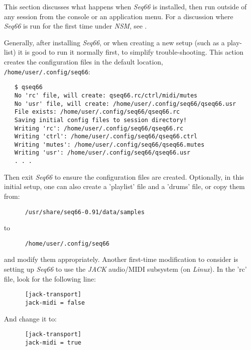    This section discusses what happens when \textsl{Seq66} is installed, then
   run outside of any session from the console or an application menu.
   For a discussion where \textsl{Seq66} is run for the first time under
   \textsl{NSM},
   see .

   Generally, after installing \textsl{Seq66}, or when creating a new setup
   (such as a play-list) it is good to run it normally first, to simplify
   trouble-shooting.
   This action creates the configuration files in the default location,
   \texttt{/home/user/.config/seq66}:

\begin{verbatim}
   $ qseq66 
   No 'rc' file, will create: qseq66.rc/ctrl/midi/mutes
   No 'usr' file, will create: /home/user/.config/seq66/qseq66.usr
   File exists: /home/user/.config/seq66/qseq66.rc
   Saving initial config files to session directory!
   Writing 'rc': /home/user/.config/seq66/qseq66.rc
   Writing 'ctrl': /home/user/.config/seq66/qseq66.ctrl
   Writing 'mutes': /home/user/.config/seq66/qseq66.mutes
   Writing 'usr': /home/user/.config/seq66/qseq66.usr
   . . .
\end{verbatim}

   Then exit \textsl{Seq66} to ensure the configuration files are created.
   Optionally, in this initial setup,
   one can also create a 'playlist' file and a 'drums' file, or
   copy them from:

   \begin{verbatim}
      /usr/share/seq66-0.91/data/samples
   \end{verbatim}

   to

   \begin{verbatim}
      /home/user/.config/seq66
   \end{verbatim}

   and modify them appropriately.
   Another first-time modification to consider is setting up \textsl{Seq66} to
   use the \textsl{JACK} audio/MIDI subsystem (on \textsl{Linux}).
   In the 'rc' file, look for the following line:

   \begin{verbatim}
      [jack-transport]
      jack-midi = false
   \end{verbatim}

   And change it to:

   \begin{verbatim}
      [jack-transport]
      jack-midi = true
   \end{verbatim}

